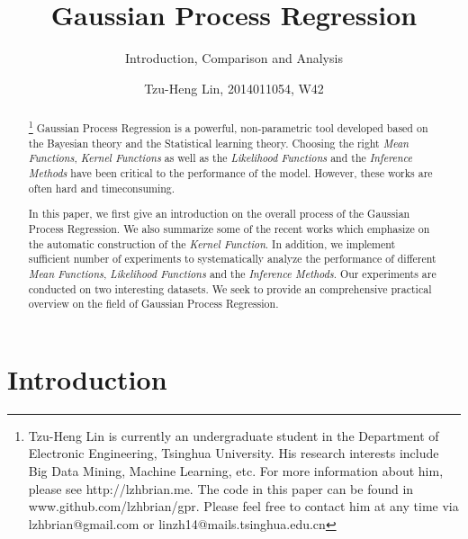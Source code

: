 \documentclass{sig-alternate-05-2015}
\begin{document}
\title{Gaussian Process Regression}
\subtitle{Introduction, Comparison and Analysis}
\author{
    \alignauthor Tzu-Heng Lin, 2014011054, W42\\
}


\maketitle
\begin{abstract}
\footnote{Tzu-Heng Lin is currently an undergraduate student in the Department of Electronic Engineering, Tsinghua University. His research interests include Big Data Mining, Machine Learning, etc. For more information about him, please see http://lzhbrian.me. The code in this paper can be found in www.github.com/lzhbrian/gpr.
Please feel free to contact him at any time via lzhbrian@gmail.com or linzh14@mails.tsinghua.edu.cn}
Gaussian Process Regression is a powerful, non-parametric tool developed based on the Bayesian theory and the Statistical learning theory. Choosing the right \emph{Mean Functions}, \emph{Kernel Functions} as well as the \emph{Likelihood Functions} and the \emph{Inference Methods} have been critical to the performance of the model. However, these works are often hard and timeconsuming.

In this paper, we first give an introduction on the overall process of the Gaussian Process Regression. 
We also summarize some of the recent works which emphasize on the automatic construction of the \emph{Kernel Function}.
In addition, we implement sufficient number of experiments to systematically analyze the performance of different \emph{Mean Functions}, \emph{Likelihood Functions} and the \emph{Inference Methods}. Our experiments are conducted on two interesting datasets. We seek to provide an comprehensive practical overview on the field of Gaussian Process Regression.

\end{abstract}




%
%
\printccsdesc



\section{Introduction} \label{sec:introduction}
\end{document}
